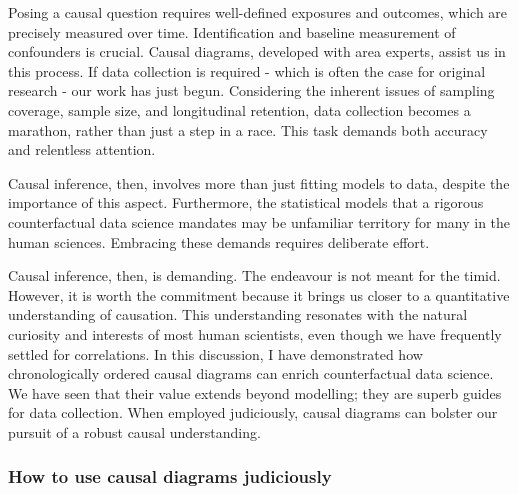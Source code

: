 \documentclass[
  singlecolumn]{article}
\begin{document}
Posing a causal question requires well-defined exposures and outcomes,
which are precisely measured over time. Identification and baseline
measurement of confounders is crucial. Causal diagrams, developed with
area experts, assist us in this process. If data collection is required
- which is often the case for original research - our work has just
begun. Considering the inherent issues of sampling coverage, sample
size, and longitudinal retention, data collection becomes a marathon,
rather than just a step in a race. This task demands both accuracy and
relentless attention.

Causal inference, then, involves more than just fitting models to data,
despite the importance of this aspect. Furthermore, the statistical
models that a rigorous counterfactual data science mandates may be
unfamiliar territory for many in the human sciences. Embracing these
demands requires deliberate effort.

Causal inference, then, is demanding. The endeavour is not meant for the
timid. However, it is worth the commitment because it brings us closer
to a quantitative understanding of causation. This understanding
resonates with the natural curiosity and interests of most human
scientists, even though we have frequently settled for correlations. In
this discussion, I have demonstrated how chronologically ordered causal
diagrams can enrich counterfactual data science. We have seen that their
value extends beyond modelling; they are superb guides for data
collection. When employed judiciously, causal diagrams can bolster our
pursuit of a robust causal understanding.

\hypertarget{how-to-use-causal-diagrams-judiciously}{%
\subsubsection{How to use causal diagrams
judiciously}\label{how-to-use-causal-diagrams-judiciously}}
\end{document}

